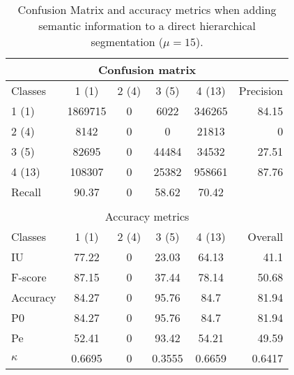 \begin{table}[htbp]
\begin{center}
\begin{tabular}{|l|c|c|c|c|r|}
\hline
\multicolumn{6}{|c|}{Confusion matrix} \\
\hline
 Classes & 1 (1) & 2 (4) & 3 (5) & 4 (13) & Precision \\
\hline
1 (1) & 1869715 & 0 & 6022 & 346265 & 84.15 \\
\hline
2 (4) & 8142 & 0 & 0 & 21813 & 0 \\
\hline
3 (5) & 82695 & 0 & 44484 & 34532 & 27.51 \\
\hline
4 (13) & 108307 & 0 & 25382 & 958661 & 87.76 \\
\hline
Recall & 90.37 & 0 & 58.62 & 70.42 &  \\
\hline
\multicolumn{6}{c}{ } \\
\hline
\multicolumn{6}{|c|}{Accuracy metrics} \\
\hline
 Classes & 1 (1) & 2 (4) & 3 (5) & 4 (13) & Overall \\
\hline
IU & 77.22 & 0 & 23.03 & 64.13 & 41.1 \\
\hline
F-score & 87.15 & 0 & 37.44 & 78.14 & 50.68 \\
\hline
Accuracy & 84.27 & 0 & 95.76 & 84.7 & 81.94 \\
\hline
P0 & 84.27 & 0 & 95.76 & 84.7 & 81.94 \\
\hline
Pe & 52.41 & 0 & 93.42 & 54.21 & 49.59 \\
\hline
$\kappa$ & 0.6695 & 0 & 0.3555 & 0.6659 & 0.6417 \\
\hline
\end{tabular}
\caption{Confusion Matrix and accuracy metrics when adding semantic information to a direct hierarchical segmentation ($\mu=15$).}
\label{table:C3_S2_seg_hierar}
\end{center}
\end{table}